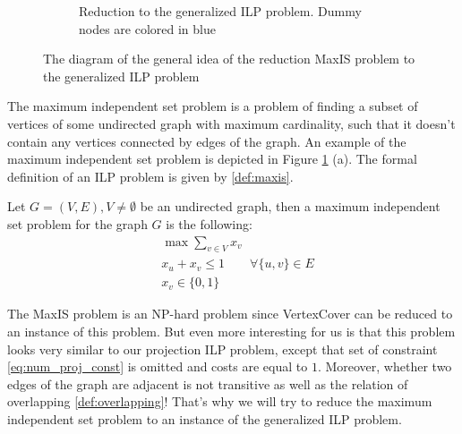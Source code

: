 \begin{figure}[ht]
\begin{subfigure}{.5\textwidth}
    \caption{Reduction to the generalized ILP problem. Dummy nodes are colored in \textcolor{blue!60}{blue}}
  \end{subfigure}
  \caption{The diagram of the general idea of the reduction MaxIS problem to the generalized ILP problem}
  \label{fig:maxis_reduction}
\end{figure}

The maximum independent set problem is a problem of finding a subset of vertices of some undirected
graph with maximum cardinality, such that it doesn't contain any vertices connected by edges of the graph.
An example of the maximum independent set problem is depicted in Figure \ref{fig:maxis_reduction} (a).
The formal definition of an ILP problem is given by \ref{def:maxis}.
\begin{definition}[MaxIS] \label{def:maxis}
  Let \( G=(V, E), V \neq \emptyset \) be an undirected graph, then a maximum independent set problem for the graph \( G \) is the following:
  \begin{align*}
    & \max \sum\limits_{v \in V} x_v                               \\
    & x_u + x_v \leq 1 \qquad \forall \{u, v\} \in E \\
    & x_v \in \{0, 1\}
  \end{align*}
\end{definition}

The MaxIS problem is an NP-hard \cite{pemmaraju2003computational} problem since VertexCover can be reduced to an instance of
this problem. But even more interesting for us is that this problem looks very similar to
our projection ILP problem, except that set of constraint \eqref{eq:num_proj_const} is
omitted and costs are equal to \( 1 \). Moreover, whether two edges of the graph are adjacent
is not transitive as well as the relation of overlapping \ref{def:overlapping}! That's why we will try to reduce
the maximum independent set problem to an instance of the generalized ILP problem.

